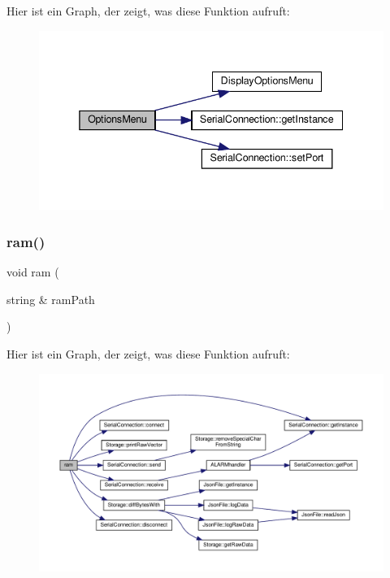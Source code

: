 Hier ist ein Graph, der zeigt, was diese Funktion aufruft\+:
\nopagebreak
\begin{figure}[H]
\begin{center}
\leavevmode
\includegraphics[width=338pt]{_jura_coffee_memory_8cpp_ae46c8e2155f07fd7da805fc23e7778ad_cgraph}
\end{center}
\end{figure}
\mbox{\label{_jura_coffee_memory_8cpp_affa74aeb23b81d2c3e06941867347bd8}} 
\subsubsection{ram()}
{\footnotesize\ttfamily void ram (\begin{DoxyParamCaption}\item[{string \&}]{ram\+Path }\end{DoxyParamCaption})}

Hier ist ein Graph, der zeigt, was diese Funktion aufruft\+:
\nopagebreak
\begin{figure}[H]
\begin{center}
\leavevmode
\includegraphics[width=350pt]{_jura_coffee_memory_8cpp_affa74aeb23b81d2c3e06941867347bd8_cgraph}
\end{center}
\end{figure}

